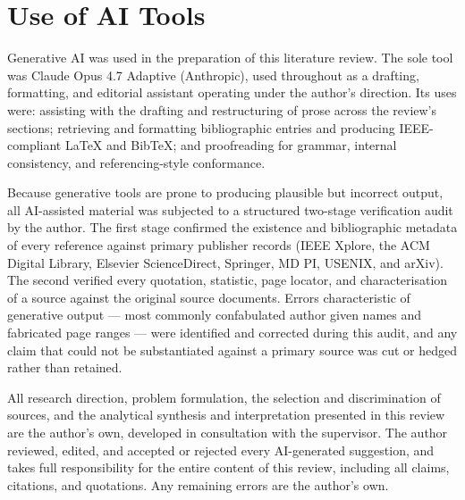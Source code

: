 \section*{Use of AI Tools}
\label{sec:ai_use}

Generative AI was used in the preparation of this literature review. The sole tool was Claude Opus 4.7 Adaptive (Anthropic), used throughout as a drafting, formatting, and editorial assistant operating under the author's direction.
Its uses were: assisting with the drafting and restructuring of prose across the review's sections; retrieving and formatting bibliographic entries and producing IEEE-compliant LaTeX and BibTeX; and proofreading for grammar, internal consistency, and referencing-style conformance.

Because generative tools are prone to producing plausible but incorrect output, all AI-assisted material was subjected to a structured two-stage verification audit by the author. The first stage confirmed the existence and bibliographic metadata of every reference against primary publisher records (IEEE Xplore, the ACM Digital Library, Elsevier ScienceDirect, Springer, MD      PI, USENIX, and arXiv). The second verified every quotation, statistic, page locator, and characterisation of a source against the original source documents. Errors characteristic of generative output — most commonly confabulated author given names and fabricated page ranges — were identified and corrected during this audit, and any claim that could not be substantiated against a primary source was cut or hedged rather than retained.

All research direction, problem formulation, the selection and discrimination of sources, and the analytical synthesis and interpretation presented in this review are the author's own, developed in consultation with the supervisor. The author reviewed, edited, and accepted or rejected every AI-generated suggestion, and takes full responsibility for the entire content of this review, including all claims, citations, and quotations. Any remaining errors are the author's own.
